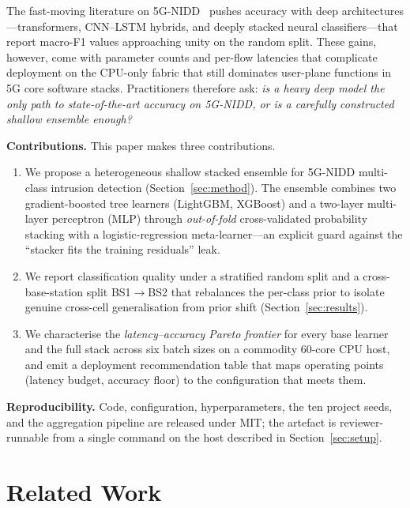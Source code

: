 \documentclass[conference]{IEEEtran}
\begin{document}
The fast-moving literature on 5G-NIDD~\cite{toupas2025_deeptransids,
ksibi2024_dtl5g,shi2024_5g_ddos_cnn_lstm,ahmed2023_dsem} pushes accuracy
with deep architectures---transformers, CNN--LSTM hybrids, and deeply
stacked neural classifiers---that report macro-F1 values approaching
unity on the random split. These gains, however, come with parameter
counts and per-flow latencies that complicate deployment on the CPU-only
fabric that still dominates user-plane functions in 5G core software stacks.
Practitioners therefore ask: \emph{is a heavy deep model the only path to
state-of-the-art accuracy on 5G-NIDD, or is a carefully constructed
shallow ensemble enough?}

\textbf{Contributions.} This paper makes three contributions.
\begin{enumerate}
    \item We propose a heterogeneous shallow stacked ensemble for 5G-NIDD
        multi-class intrusion detection (Section~\ref{sec:method}). The
        ensemble combines two gradient-boosted tree learners (LightGBM,
        XGBoost) and a two-layer multi-layer perceptron (MLP) through
        \emph{out-of-fold} cross-validated probability stacking with a
        logistic-regression meta-learner---an explicit guard against the
        ``stacker fits the training residuals'' leak.
    \item We report classification quality under a stratified random
        split and a cross-base-station split BS1$\rightarrow$BS2 that
        rebalances the per-class prior to isolate genuine cross-cell
        generalisation from prior shift (Section~\ref{sec:results}).
    \item We characterise the \emph{latency--accuracy Pareto frontier}
        for every base learner and the full stack across six batch sizes
        on a commodity 60-core CPU host, and emit a deployment
        recommendation table that maps operating points (latency budget,
        accuracy floor) to the configuration that meets them.
\end{enumerate}

\textbf{Reproducibility.} Code, configuration, hyperparameters, the ten
project seeds, and the aggregation pipeline are released under MIT;
the artefact is reviewer-runnable from a single command on the host
described in Section~\ref{sec:setup}.

\section{Related Work}
\label{sec:related}
\end{document}
